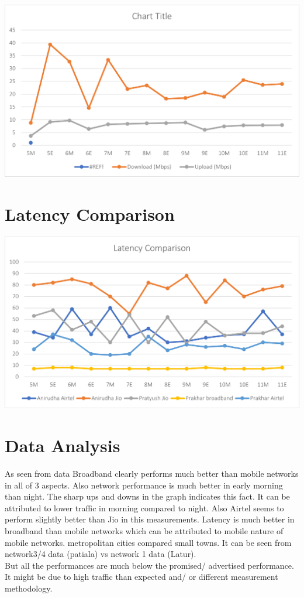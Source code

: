 \documentclass{article}
\begin{document}
\includegraphics[]{prat.png}
\pagebreak
\section{Latency Comparison}
\includegraphics{latency.png}
\pagebreak
\section{Data Analysis}
As seen from data Broadband clearly performs much better than mobile networks in all of 3 aspects. Also network performance is much better in early morning than night. The sharp ups and downs in the graph indicates this fact. It can be attributed to lower traffic in morning compared to night. Also Airtel seems to perform slightly better than Jio in this measurements. Latency is much better in broadband than mobile networks which can be attributed to mobile nature of mobile networks. metropolitan cities compared small towns. It can be seen from network3/4 data (patiala) vs network 1 data (Latur).\\ But all the performances are much below the promised/ advertised performance. It might be due to high traffic than expected and/ or different measurement methodology.
\pagebreak
\end{document}
